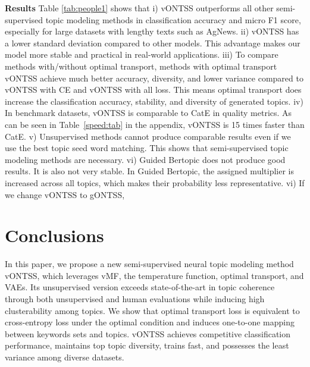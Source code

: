 \documentclass[11pt]{article}
\begin{document}
\textbf{Results} Table \ref{tab:people1} shows that i) vONTSS outperforms all other semi-supervised topic modeling methods in classification accuracy and micro F1 score, especially for large datasets with lengthy texts such as AgNews. ii) vONTSS has a lower standard deviation compared to other models. This advantage makes our model more stable and practical in real-world applications. iii) To compare methods with/without optimal transport, methods with optimal transport vONTSS achieve much better accuracy, diversity, and lower variance compared to vONTSS with CE and vONTSS with all loss. This means optimal transport does increase the classification accuracy, stability, and diversity of generated topics. iv) In benchmark datasets, vONTSS is comparable to CatE in quality metrics. As can be seen in Table~\ref{speed:tab} in the appendix, vONTSS is 15 times faster than CatE. v) Unsupervised methods cannot produce comparable results even if we use the best topic seed word matching. This shows that semi-supervised topic modeling methods are necessary. vi) Guided Bertopic does not produce good results. It is also not very stable. In Guided Bertopic, the assigned multiplier is increased across all topics, which makes their probability less representative. vi) If we change vONTSS to gONTSS, 

\section{Conclusions}
In this paper, we propose a new semi-supervised neural topic modeling method vONTSS, which leverages vMF, the temperature function, optimal transport, and VAEs. Its unsupervised version exceeds state-of-the-art in topic coherence through both unsupervised and human evaluations while inducing high clusterability among topics. We show that optimal transport loss is equivalent to cross-entropy loss under the optimal condition and induces one-to-one mapping between keywords sets and topics. vONTSS achieves competitive classification performance, maintains top topic diversity, trains fast, and possesses the least variance among diverse datasets. 

\newpage
\end{document}

